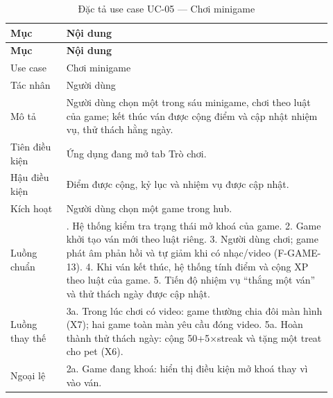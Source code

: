 \begingroup\small\renewcommand{\arraystretch}{1.15}\setlength{\tabcolsep}{3pt}
\begin{longtable}{>{\RaggedRight\arraybackslash}p{0.16\linewidth}>{\RaggedRight\arraybackslash}p{0.76\linewidth}}
\caption{Đặc tả use case UC-05 --- Chơi minigame}
\label{tab:spec-uc-05}\\
\toprule
\textbf{Mục} & \textbf{Nội dung} \\
\midrule
\endfirsthead
\toprule
\textbf{Mục} & \textbf{Nội dung} \\
\midrule
\endhead
\bottomrule
\endfoot
Use case & Chơi minigame \\
Tác nhân & Người dùng \\
Mô tả & Người dùng chọn một trong sáu minigame, chơi theo luật của game; kết thúc ván được cộng điểm và cập nhật nhiệm vụ, thử thách hằng ngày. \\
Tiên điều kiện & Ứng dụng đang mở tab Trò chơi. \\
Hậu điều kiện & Điểm được cộng, kỷ lục và nhiệm vụ được cập nhật. \\
Kích hoạt & Người dùng chọn một game trong hub. \\
Luồng chuẩn & 1. Hệ thống kiểm tra trạng thái mở khoá của game. 2. Game khởi tạo ván mới theo luật riêng. 3. Người dùng chơi; game phát âm phản hồi và tự giảm khi có nhạc/video (F-GAME-13). 4. Khi ván kết thúc, hệ thống tính điểm và cộng XP theo luật của game. 5. Tiến độ nhiệm vụ “thắng một ván” và thử thách ngày được cập nhật. \\
Luồng thay thế & 3a. Trong lúc chơi có video: game thường chia đôi màn hình (X7); hai game toàn màn yêu cầu đóng video. 5a. Hoàn thành thử thách ngày: cộng 50+5×streak và tặng một treat cho pet (X6). \\
Ngoại lệ & 2a. Game đang khoá: hiển thị điều kiện mở khoá thay vì vào ván. \\
\end{longtable}
\endgroup

